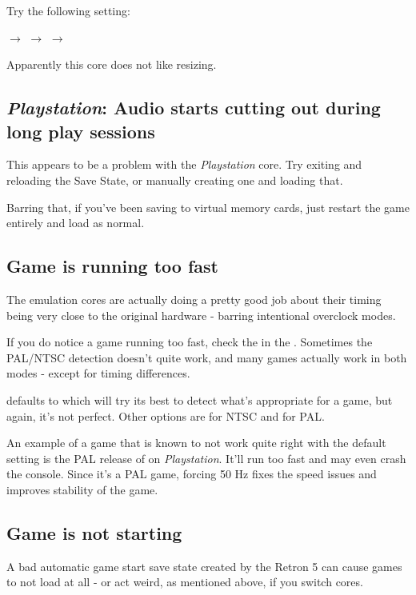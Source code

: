 \documentclass[english]{retronlabo-manual}
\begin{document}
Try the following setting:

 $\rightarrow$  $\rightarrow$  $\rightarrow$ 

Apparently this core does not like resizing.

\subsection{\emph{Playstation}: Audio starts cutting out during long play sessions}

This appears to be a problem with the \emph{Playstation} core. Try exiting and reloading the Save State, or manually creating one and loading that.

Barring that, if you've been saving to virtual memory cards, just restart the game entirely and load as normal.

\subsection{Game is running too fast}

The emulation cores are actually doing a pretty good job about their timing being very close to the original hardware - barring intentional overclock modes.

If you do notice a game running too fast, check the  in the . Sometimes the PAL/NTSC detection doesn't quite work, and many games actually work in both modes - except for timing differences.

 defaults to  which will try its best to detect what's appropriate for a game, but again, it's not perfect. Other options are  for NTSC and  for PAL.

An example of a game that is known to not work quite right with the default  setting is the PAL release of  on \emph{Playstation}. It'll run too fast and may even crash the console. Since it's a PAL game, forcing 50 Hz fixes the speed issues and improves stability of the game.

\subsection{Game is not starting}

A bad automatic game start save state created by the Retron 5 can cause games to not load at all - or act weird, as mentioned above, if you switch cores.
\end{document}
